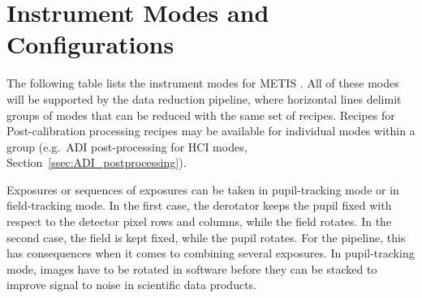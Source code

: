 \section{Instrument Modes and Configurations}
\label{sec:instrument_modes}

The following table lists the instrument modes for METIS
\cite{METIS-operational_concept}. All of these modes will be
supported by the data reduction pipeline, where horizontal lines
delimit groups of modes that can be reduced with the same set of
recipes.
Recipes for Post-calibration processing recipes may be available for individual
modes within a group (e.g.\ \ac{ADI} post-processing for HCI modes, Section~\ref{ssec:ADI_postprocessing}).

Exposures or sequences of exposures can be taken in pupil-tracking
mode or in field-tracking mode. In the first case, the derotator keeps
the pupil fixed with respect to the detector pixel rows and columns,
while the field rotates. In the second case, the field is kept fixed,
while the pupil rotates. For the pipeline, this has consequences when
it comes to combining several exposures. In pupil-tracking mode,
images have to be rotated in software before they can be stacked to
improve signal to noise in scientific data products.

